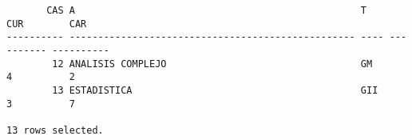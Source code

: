 \documentclass[11pt]{report}
\begin{document}
\begin{verbatim}
       CAS A                                                  T           CUR        CAR                                                                                            
---------- -------------------------------------------------- ---- ---------- ----------                                                                                            
        12 ANALISIS COMPLEJO                                  GM            4          2                                                                                            
        13 ESTADISTICA                                        GII           3          7                                                                                            

13 rows selected.
  \end{verbatim}

\end{document}
